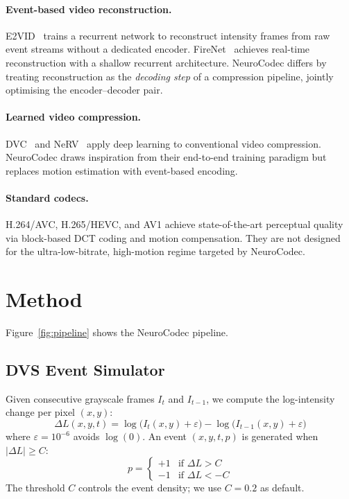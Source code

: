 \documentclass[10pt,twocolumn,letterpaper]{article}
\begin{document}
\paragraph{Event-based video reconstruction.}
E2VID~\cite{rebecq2019e2vid} trains a recurrent network to reconstruct
intensity frames from raw event streams without a dedicated encoder.
FireNet~\cite{scheerlinck2020fast} achieves real-time reconstruction with a
shallow recurrent architecture.
NeuroCodec differs by treating reconstruction as the \emph{decoding step} of a
compression pipeline, jointly optimising the encoder–decoder pair.

\paragraph{Learned video compression.}
DVC~\cite{lu2019dvc} and NeRV~\cite{chen2021nerv} apply deep learning to
conventional video compression.
NeuroCodec draws inspiration from their end-to-end training paradigm but
replaces motion estimation with event-based encoding.

\paragraph{Standard codecs.}
H.264/AVC, H.265/HEVC, and AV1 achieve state-of-the-art perceptual quality via
block-based DCT coding and motion compensation.
They are not designed for the ultra-low-bitrate, high-motion regime targeted
by NeuroCodec.

\section{Method}
\label{sec:method}

Figure~\ref{fig:pipeline} shows the NeuroCodec pipeline.

\subsection{DVS Event Simulator}
\label{sec:method:sim}

Given consecutive grayscale frames $I_t$ and $I_{t-1}$, we compute the
log-intensity change per pixel $(x, y)$:
\begin{equation}
  \Delta L(x,y,t) = \log\!\bigl(I_t(x,y) + \varepsilon\bigr)
                  - \log\!\bigl(I_{t-1}(x,y) + \varepsilon\bigr)
\end{equation}
where $\varepsilon = 10^{-6}$ avoids $\log(0)$.
An event $(x, y, t, p)$ is generated when $|\Delta L| \geq C$:
\begin{equation}
  p = \begin{cases} +1 & \text{if } \Delta L > C \\ -1 & \text{if } \Delta L < -C \end{cases}
\end{equation}
The threshold $C$ controls the event density; we use $C = 0.2$ as default.
\end{document}
